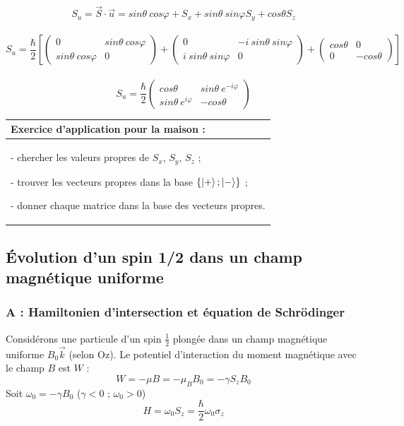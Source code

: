 \documentclass[12pt,a4paper,titlepage]{book}
\begin{document}
\begin{center}
\[
S_u = \overrightarrow{S} \cdot \overrightarrow{u} = sin \theta ~cos \varphi + S_x + sin \theta ~sin \varphi S_y + cos \theta S_z
\]\\

\[
S_u = \frac{\hbar}{2}
\left[
\left(
\begin{matrix}
0 & sin \theta ~cos \varphi \\
sin \theta ~cos \varphi & 0
\end{matrix}
\right)
+
\left(
\begin{matrix}
0 & -i ~sin \theta ~sin \varphi \\
i ~sin \theta ~sin \varphi & 0
\end{matrix}
\right)
+
\left(
\begin{matrix}
cos \theta & 0 \\
0 & -cos \theta
\end{matrix}
\right)
\right]
\]\\

\[
S_u = \frac{\hbar}{2}
\left(
\begin{matrix}
cos \theta & sin \theta ~e^{-i \varphi} \\
sin \theta ~e^{i \varphi} & -cos \theta
\end{matrix}
\right)
\]
\end{center}

\begin{tabular}{|p{15cm}|}

\hline
\textbf{Exercice d'application pour la maison :}\\
\hline
- chercher les valeurs propres de $S_x$, $S_y$, $S_z$ ;

- trouver les vecteurs propres dans la base $\lbrace \ket+ ; \ket- \rbrace$ ;

- donner chaque matrice dans la base des vecteurs propres.\\
\hline
\end{tabular}

\subsection{Évolution d'un spin 1/2 dans un champ magnétique uniforme}
\subsubsection{A : Hamiltonien d'intersection et équation de Schrödinger}

Considérons une particule d'un spin $\frac{1}{2}$ plongée dans un champ magnétique uniforme $B_0 \overrightarrow{k}$ (selon Oz). Le potentiel d'interaction du moment magnétique avec le champ $B$ est $W$ :
\begin{equation*}
W = -\mu B = -\mu_{B} B_0 = -\gamma S_z B_0
\end{equation*}
Soit $\omega_0 = -\gamma B_0$ ($\gamma < 0$ ; $\omega_0 > 0$)
\begin{equation*}
H = \omega_0 S_z = \frac{\hbar}{2} \omega_0 \sigma_z
\end{equation*}
\end{document}
